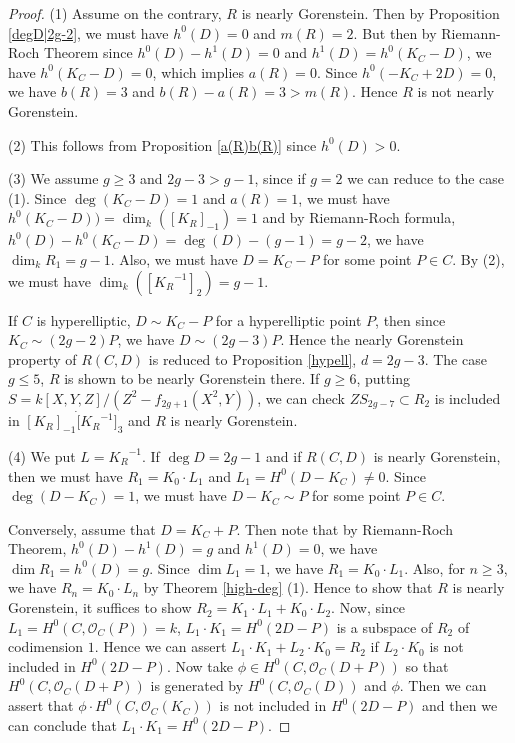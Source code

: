 \documentclass[12pt]{amsart}
\theoremstyle{definition}
\theoremstyle{remark}
\numberwithin{equation}{section}
\newcommand{\KiR}{{K_R}^{-1}}
\newcommand{\cO}{\mathcal O}
\renewcommand{\:}{\colon}
\begin{document}
\begin{proof} (1) Assume on the contrary, $R$ is nearly Gorenstein. 
Then by Proposition \ref{degD|2g-2}, we must have $h^0(D) =0$ and $m(R)=2$.
But then by Riemann-Roch Theorem since $h^0(D) - h^1(D)=0$ and 
$h^1(D)=h^0(K_C-D)$, we have $h^0(K_C -D)=0$, which implies $a(R)=0$. 
Since $h^0(-K_C+2D) =0$, we have $b(R)=3$ and $b(R) -a(R)=3 > m(R)$. 
Hence $R$ is not nearly Gorenstein.\par  
(2) This follows from Proposition \ref{a(R)b(R)} since $h^0(D)>0$.  
\par
(3) We assume $g\ge 3$ and  $2g-3 > g-1$, since if $g=2$ we can reduce to the case (1). 
Since $\deg(K_C-D)=1$ and $a(R)=1$, we must have $h^0(K_C-D))=\dim_k ([K_R]_{-1})=1$ and  
by Riemann-Roch formula, $h^0(D) - h^0(K_C -D) = \deg(D) - (g-1) = g-2$, we have   
$\dim_k R_1 = g-1$. Also, we must have $D=K_C -P$ for some point 
$P\in C$. 
By (2), we must have $\dim_k([\KiR]_2) = g-1$. \par
If $C$ is hyperelliptic, $D\sim K_C-P$ for a hyperelliptic point $P$, 
then since $K_C \sim (2g-2)P$, we have $D\sim (2g-3)P$. 
 Hence the nearly Gorenstein property of $R(C,D)$ is reduced to Proposition  
\ref{hypell}, $d=2g-3$. The case $g\le 5$, $R$ is shown to be nearly Gorenstein there.
If $g\ge 6$, putting $S = k[X,Y,Z]/(Z^2 - f_{2g+1}(X^2,Y))$, we can check 
 $Z S_{2g-7}\subset R_2$ is included in $[K_R]_{-1}\dot [\KiR]_3$ and $R$ is nearly Gorenstein.  
 \par 
(4) We put  $L= \KiR$. If $\deg D = 2g-1$ and if $R(C,D)$ is nearly Gorenstein, then we must have 
$R_1= K_0\cdot L_1$ and $L_1 = H^0(D-K_C)\ne 0$. Since $\deg (D-K_C)=1$, we must have 
$D-K_C \sim P$ for some point $P\in C$. 
\par
Conversely, assume that $D=K_C +P$. Then note that by Riemann-Roch Theorem, 
 $h^0(D) - h^1(D) = g$ and $h^1(D)=0$, we have $\dim R_1= h^0(D)=g$. Since $\dim L_1=1$, 
 we have $R_1= K_0\cdot L_1$.  
 Also, for $n\ge 3$, we have $R_n = K_0\cdot L_n$ by 
 Theorem \ref{high-deg} (1). Hence  to show that $R$ is nearly 
 Gorenstein, it suffices to show  $R_2 = K_1\cdot L_1 + K_0\cdot L_2$. 
Now, since $L_1 = H^0(C, \cO_C(P)) = k$, 
$L_1 \cdot K_1=H^0(2D-P)$ is a subspace of $R_2$ of codimension $1$. 
Hence we can assert $L_1\cdot K_1 + L_2\cdot K_0 =R_2$ 
if $L_2\cdot K_0$ is not included in 
$H^0(2D -P)$.  Now take $\phi \in H^0(C, \cO_C(D+P))$ so that 
$H^0(C, \cO_C(D+P))$ 
is generated by $H^0(C, \cO_C(D))$ and $\phi$. Then we can assert that 
$\phi\cdot H^0(C, \cO_C(K_C))$ is not included in $H^0(2D-P)$ and then we can conclude 
that $L_1\cdot K_1=H^0(2D-P)$. 
\end{proof}
\end{document}
